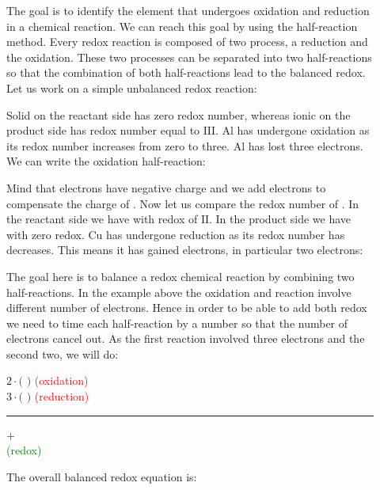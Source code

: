 \documentclass[main.tex]{subfiles}
\begin{document}
\begin{description}
\item[] The goal is to identify the element that undergoes oxidation and reduction in a chemical reaction. 
We can reach this goal by using the half-reaction method. Every redox reaction is composed of two process, a reduction and the oxidation. These two processes can be separated into two half-reactions so that the combination of both half-reactions lead to the balanced redox. Let us work on a simple unbalanced redox reaction:
\begin{center}\end{center}
Solid  on the reactant side has zero redox number, whereas ionic  on the product side has redox number equal to $\text{III}$. Al has undergone oxidation as its redox number increases from zero to three. Al has lost three electrons. We can write the oxidation half-reaction:
\begin{center}\end{center}
Mind that electrons have negative charge and we add electrons to compensate the charge of . 
Now let us compare the redox number of . In the reactant side we have  with redox of $\text{II}$. In the product side we have  with zero redox. Cu has undergone reduction as its redox number has decreases. This means it has gained electrons, in particular two electrons: 
\begin{center}\end{center}

 \item[] The goal here is to balance a redox chemical reaction by combining two half-reactions. In the example above the oxidation and reaction involve different number of electrons. Hence in order to be able to add both redox we need to time each half-reaction by a number so that the number of electrons cancel out. As the first reaction involved three electrons and the second two, we will do:
 \begin{center}
$2\cdot \big($  $\big)$ \hspace*{0pt}\hfill  \textcolor{red}{ (oxidation) }\\
$3\cdot \big($  $\big)$ \hspace*{0pt}\hfill  \textcolor{red}{ (reduction) } \\
\rule{12cm}{0.4pt}$+$\\
  \hspace*{0pt}\hfill  \textcolor{green}{ (redox) } \\
 \end{center}
The overall balanced redox equation is:


\end{description}
\end{document}
